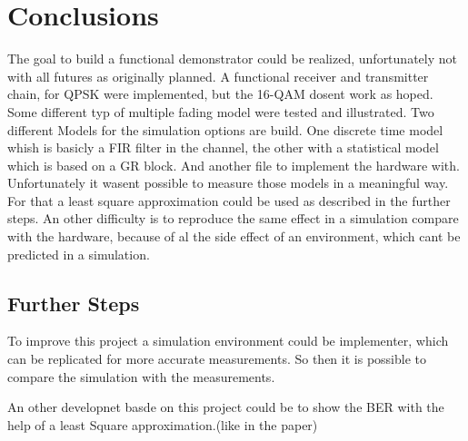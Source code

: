 
\chapter{Conclusions} \label{chp:conclusions}

The goal to build a functional demonstrator could be realized, unfortunately not with all futures as originally planned. A functional receiver and transmitter chain, for QPSK were implemented,
but the 16-QAM dosent work as hoped.
Some different typ of multiple fading model were tested and illustrated.
Two different Models for the simulation options are build. One discrete time model whish is basicly a FIR filter in the channel, the other with a statistical model which is based on a GR block.
And another file to implement the hardware with. Unfortunately it wasent possible to measure those models in a meaningful way. For that a least square approximation could be used as described in the further steps. An other difficulty is to reproduce the same effect in a simulation compare with the hardware, because of al the side effect of an environment, which cant be predicted in a simulation.




\section{Further Steps}

To improve this project a simulation environment could be implementer, which can be replicated for more accurate measurements. So then it is possible to compare the simulation with the measurements.

An other  developnet basde on this project could be to show the BER with the help of a least Square approximation.(like in the paper)
